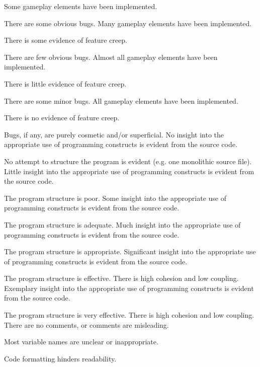 \documentclass{../fal_assignment}
\begin{document}
\begin{markingrubric}
        \grade Some gameplay elements have been implemented.
            \par There are some obvious bugs.
        \grade Many gameplay elements have been implemented.
            \par There is some evidence of feature creep.
            \par There are few obvious bugs.
        \grade Almost all gameplay elements have been implemented.
            \par There is little evidence of feature creep.
            \par There are some minor bugs.
        \grade All gameplay elements have been implemented.
            \par There is no evidence of feature creep.
            \par Bugs, if any, are purely cosmetic and/or superficial.
%
        \grade\fail No insight into the appropriate use of programming constructs is evident from the source code.
            \par No attempt to structure the program is evident (e.g. one monolithic source file).
        \grade Little insight into the appropriate use of programming constructs is evident from the source code.
            \par The program structure is poor.
        \grade Some insight into the appropriate use of programming constructs is evident from the source code.
            \par The program structure is adequate.
        \grade Much insight into the appropriate use of programming constructs is evident from the source code.
            \par The program structure is appropriate.
        \grade Significant insight into the appropriate use of programming constructs is evident from the source code.
            \par The program structure is effective. There is high cohesion and low coupling.
        \grade Exemplary insight into the appropriate use of programming constructs is evident from the source code.
            \par The program structure is very effective. There is high cohesion and low coupling.
%
        \grade\fail There are no comments, or comments are misleading.
            \par Most variable names are unclear or inappropriate.
            \par Code formatting hinders readability.

\end{markingrubric}
\end{document}
